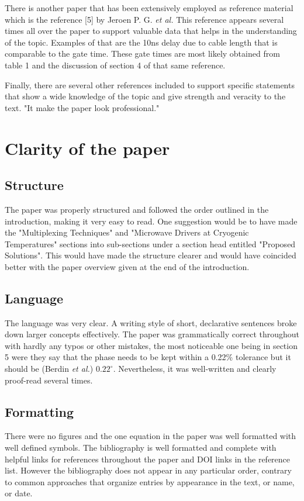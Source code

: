 \documentclass[11pt]{article}
\begin{document}
There is another paper that has been extensively employed as reference material
which is the reference [5] by Jeroen P. G. \emph{et al.} This reference appears
several times all over the paper to support valuable data that helps in the
understanding of the topic. Examples of that are the 10ns delay due to cable
length that is comparable to the gate time. These gate times are most likely
obtained from table 1 and the discussion of section 4 of that same reference.


Finally, there are several other references included to support specific
statements that show a wide knowledge of the topic and give strength and
veracity to the text. "It make the paper look professional."


\section{Clarity of the paper}
\label{sec:orgd9b6e0d}

\subsection{Structure}
\label{sec:org38a86f9}
The paper was properly structured and followed the order outlined in
the introduction, making it very easy to read. One suggestion would be
to have made the "Multiplexing Techniques" and "Microwave Drivers at
Cryogenic Temperatures" sections into sub-sections under a section
head entitled "Proposed Solutions". This would have made the structure
clearer and would have coincided better with the paper overview given
at the end of the introduction.

\subsection{Language}
\label{sec:orge30959e}
The language was very clear. A writing style of short, declarative sentences
broke down larger concepts effectively. The paper was grammatically correct
throughout with hardly any typos or other mistakes, the most noticeable one
being in section 5 were they say that the phase needs to be kept within a 0.22\%
tolerance but it should be (Berdin \emph{et al.}) $0.22^\circ$. Nevertheless, it
was well-written and clearly proof-read several times. 

\subsection{Formatting}
\label{sec:org94cb047}
There were no figures and the one equation in the paper was
well formatted with well defined symbols. The bibliography is well
formatted and complete with helpful links for references throughout
the paper and DOI links in the reference list. However the
bibliography does not appear in any particular order, contrary to
common approaches that organize entries by appearance in the text, or
name, or date.
\end{document}
